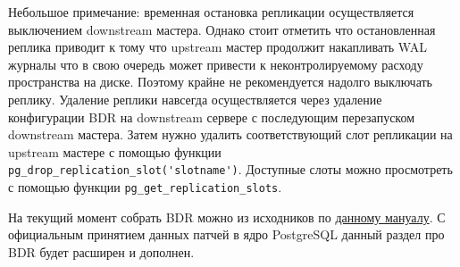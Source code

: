 Небольшое примечание: временная остановка репликации осуществляется выключением downstream мастера. Однако стоит отметить что остановленная реплика приводит к тому что upstream мастер продолжит накапливать WAL журналы что в свою очередь может привести к неконтролируемому расходу пространства на диске. Поэтому крайне не рекомендуется надолго выключать реплику. Удаление реплики навсегда осуществляется через удаление конфигурации BDR на downstream сервере с последующим перезапуском downstream мастера. Затем нужно удалить соответствующий слот репликации на upstream мастере с помощью функции \lstinline!pg_drop_replication_slot('slotname')!. Доступные слоты можно просмотреть с помощью функции \lstinline!pg_get_replication_slots!.

На текущий момент собрать BDR можно из исходников по \href{https://wiki.postgresql.org/wiki/BDR_Quick_Start}{данному мануалу}. С официальным принятием данных патчей в ядро PostgreSQL данный раздел про BDR будет расширен и дополнен.
